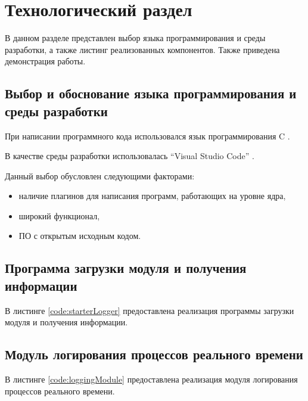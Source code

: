 \section{Технологический раздел}
В данном разделе представлен выбор языка программирования и среды разработки, а также листинг реализованных компонентов. Также приведена демонстрация работы.

\subsection{Выбор и обоснование языка программирования и среды разработки}
При написании программного кода использовался язык программирования C \cite{cLanguage}.

В качестве среды разработки использовалась ``Visual Studio Code'' \cite{VSCode}.

Данный выбор обусловлен следующими факторами:
\begin{itemize}
\item наличие плагинов для написания программ, работающих на уровне ядра,
\item широкий функционал,
\item ПО с открытым исходным кодом.
\end{itemize}

\subsection{Программа загрузки модуля и получения информации}
В листинге \ref{code:starterLogger} предоставлена реализация программы загрузки модуля и получения информации.


\subsection{Модуль логирования процессов реального времени}
В листинге \ref{code:loggingModule} предоставлена реализация модуля логирования процессов реального времени.
\newpage
{}

